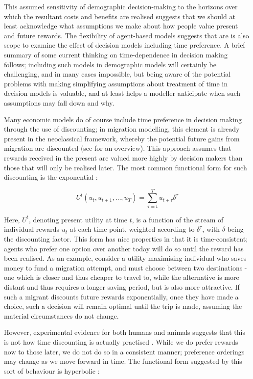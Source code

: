 \documentclass{article}
\begin{document}
This assumed sensitivity of demographic decision-making to the horizons over which the resultant costs and benefits are realised suggests that we should at least acknowledge what assumptions we make about how people value present and future rewards. The flexibility of agent-based models suggests that are is also scope to examine the effect of decision models including time preference. A brief summary of some current thinking on time-dependence in decision making follows; including such models in demographic models will certainly be challenging, and in many cases impossible, but being aware of the potential problems with making simplifying assumptions about treatment of time in decision models is valuable, and at least helps a modeller anticipate when such assumptions may fall down and why.

Many economic models do of course include time preference in decision making through the use of discounting; in migration modelling, this element is already present in the neoclassical framework, whereby the potential future gains from migration are discounted (see \citet{Massey1993} for an overview). This approach assumes that rewards received in the present are valued more highly by decision makers than those that will only be realised later. The most common functional form for such discounting is the exponential \citep{ODonoghue2000}:

\[
U^{t}(u_t, u_{t+1},\dots,u_T ) = \sum_{\tau=t}^{T} u_{t+\tau}\delta^{\tau}
\]

Here, \(U^t\), denoting present utility at time \(t\), is a function of the stream of individual rewards \(u_t\) at each time point, weighted  according to \(\delta^{\tau}\), with \(\delta\) being the discounting factor. This form has nice properties in that it is time-consistent; agents who prefer one option over another today will do so until the reward has been realised. As an example, consider a utility maximising individual who saves money to fund a migration attempt, and must choose between two destinations - one which is closer and thus cheaper to travel to, while the alternative is more distant and thus requires a longer saving period, but is also more attractive. If such a migrant discounts future rewards exponentially, once they have made a choice, such a decision will remain optimal until the trip is made, assuming the material circumstances do not change.


However, experimental evidence for both humans and animals suggests that this is not how time discounting is actually practised \citep{Boyer2008}. While we do prefer rewards now to those later, we do not do so in a consistent manner; preference orderings may change as we move forward in time. The functional form suggested by this sort of behaviour is hyperbolic \citep{Benhabib2010}:
\end{document}
